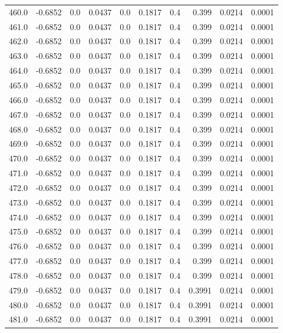\begin{longtable}{lrrrrrrrrr}
460.0 & -0.6852 & 0.0 & 0.0437 & 0.0 & 0.1817 & 0.4 & 0.399 & 0.0214 & 0.0001 \\
461.0 & -0.6852 & 0.0 & 0.0437 & 0.0 & 0.1817 & 0.4 & 0.399 & 0.0214 & 0.0001 \\
462.0 & -0.6852 & 0.0 & 0.0437 & 0.0 & 0.1817 & 0.4 & 0.399 & 0.0214 & 0.0001 \\
463.0 & -0.6852 & 0.0 & 0.0437 & 0.0 & 0.1817 & 0.4 & 0.399 & 0.0214 & 0.0001 \\
464.0 & -0.6852 & 0.0 & 0.0437 & 0.0 & 0.1817 & 0.4 & 0.399 & 0.0214 & 0.0001 \\
465.0 & -0.6852 & 0.0 & 0.0437 & 0.0 & 0.1817 & 0.4 & 0.399 & 0.0214 & 0.0001 \\
466.0 & -0.6852 & 0.0 & 0.0437 & 0.0 & 0.1817 & 0.4 & 0.399 & 0.0214 & 0.0001 \\
467.0 & -0.6852 & 0.0 & 0.0437 & 0.0 & 0.1817 & 0.4 & 0.399 & 0.0214 & 0.0001 \\
468.0 & -0.6852 & 0.0 & 0.0437 & 0.0 & 0.1817 & 0.4 & 0.399 & 0.0214 & 0.0001 \\
469.0 & -0.6852 & 0.0 & 0.0437 & 0.0 & 0.1817 & 0.4 & 0.399 & 0.0214 & 0.0001 \\
470.0 & -0.6852 & 0.0 & 0.0437 & 0.0 & 0.1817 & 0.4 & 0.399 & 0.0214 & 0.0001 \\
471.0 & -0.6852 & 0.0 & 0.0437 & 0.0 & 0.1817 & 0.4 & 0.399 & 0.0214 & 0.0001 \\
472.0 & -0.6852 & 0.0 & 0.0437 & 0.0 & 0.1817 & 0.4 & 0.399 & 0.0214 & 0.0001 \\
473.0 & -0.6852 & 0.0 & 0.0437 & 0.0 & 0.1817 & 0.4 & 0.399 & 0.0214 & 0.0001 \\
474.0 & -0.6852 & 0.0 & 0.0437 & 0.0 & 0.1817 & 0.4 & 0.399 & 0.0214 & 0.0001 \\
475.0 & -0.6852 & 0.0 & 0.0437 & 0.0 & 0.1817 & 0.4 & 0.399 & 0.0214 & 0.0001 \\
476.0 & -0.6852 & 0.0 & 0.0437 & 0.0 & 0.1817 & 0.4 & 0.399 & 0.0214 & 0.0001 \\
477.0 & -0.6852 & 0.0 & 0.0437 & 0.0 & 0.1817 & 0.4 & 0.399 & 0.0214 & 0.0001 \\
478.0 & -0.6852 & 0.0 & 0.0437 & 0.0 & 0.1817 & 0.4 & 0.399 & 0.0214 & 0.0001 \\
479.0 & -0.6852 & 0.0 & 0.0437 & 0.0 & 0.1817 & 0.4 & 0.3991 & 0.0214 & 0.0001 \\
480.0 & -0.6852 & 0.0 & 0.0437 & 0.0 & 0.1817 & 0.4 & 0.3991 & 0.0214 & 0.0001 \\
481.0 & -0.6852 & 0.0 & 0.0437 & 0.0 & 0.1817 & 0.4 & 0.3991 & 0.0214 & 0.0001 \\

\end{longtable}
